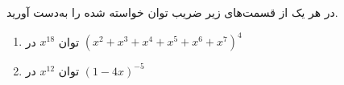     \p 
در هر یک از قسمت‌های زیر ضریب توان خواسته شده را به‌دست آورید.
\begin{enumerate}
\item
توان
$x^{18}$
در
$(x^2 + x^3 + x^4 + x^5 + x^6 + x^7)^4$
\item
توان
$x^{12}$
در
$(1 - 4x)^{-5}$
\end{enumerate}